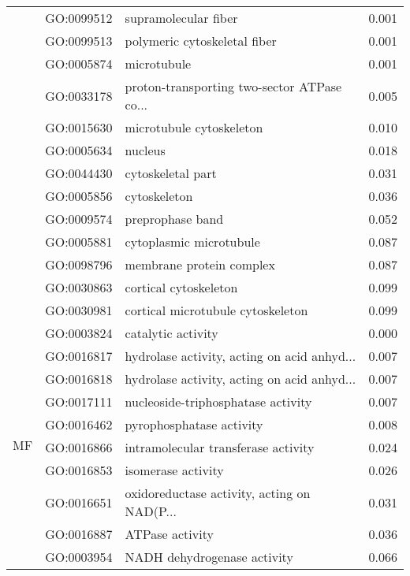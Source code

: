 \begin{longtable}{lllr}
   & GO:0099512 &                         supramolecular fiber &         0.001 \\
   & GO:0099513 &                 polymeric cytoskeletal fiber &         0.001 \\
   & GO:0005874 &                                  microtubule &         0.001 \\
   & GO:0033178 &  proton-transporting two-sector ATPase co... &         0.005 \\
   & GO:0015630 &                     microtubule cytoskeleton &         0.010 \\
   & GO:0005634 &                                      nucleus &         0.018 \\
   & GO:0044430 &                            cytoskeletal part &         0.031 \\
   & GO:0005856 &                                 cytoskeleton &         0.036 \\
   & GO:0009574 &                             preprophase band &         0.052 \\
   & GO:0005881 &                      cytoplasmic microtubule &         0.087 \\
   & GO:0098796 &                     membrane protein complex &         0.087 \\
   & GO:0030863 &                        cortical cytoskeleton &         0.099 \\
   & GO:0030981 &            cortical microtubule cytoskeleton &         0.099 \\
\cline{1-4}
\multirow{10}{*}{MF} & GO:0003824 &                           catalytic activity &         0.000 \\
   & GO:0016817 &  hydrolase activity, acting on acid anhyd... &         0.007 \\
   & GO:0016818 &  hydrolase activity, acting on acid anhyd... &         0.007 \\
   & GO:0017111 &           nucleoside-triphosphatase activity &         0.007 \\
   & GO:0016462 &                     pyrophosphatase activity &         0.008 \\
   & GO:0016866 &          intramolecular transferase activity &         0.024 \\
   & GO:0016853 &                           isomerase activity &         0.026 \\
   & GO:0016651 &  oxidoreductase activity, acting on NAD(P... &         0.031 \\
   & GO:0016887 &                              ATPase activity &         0.036 \\
   & GO:0003954 &                  NADH dehydrogenase activity &         0.066 \\
\end{longtable}
